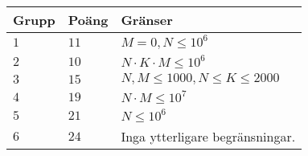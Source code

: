 \noindent
\begin{tabular}{| l | l | l |}
  \hline
  \textbf{Grupp} & \textbf{Poäng} & \textbf{Gränser} \\ \hline
  $1$    & $11$      &  $M = 0, N \leq 10^6$ \\ \hline
  $2$    & $10$      &  $N \cdot K \cdot M \leq 10^6$ \\ \hline
  $3$    & $15$      &  $N, M \leq 1000, N \leq K \leq 2000$ \\ \hline
  $4$    & $19$      &  $N \cdot M \leq 10^7$ \\ \hline
  $5$    & $21$      &  $N \leq 10^6 $ \\ \hline
  $6$    & $24$      &  Inga ytterligare begränsningar. \\ \hline
\end{tabular}
